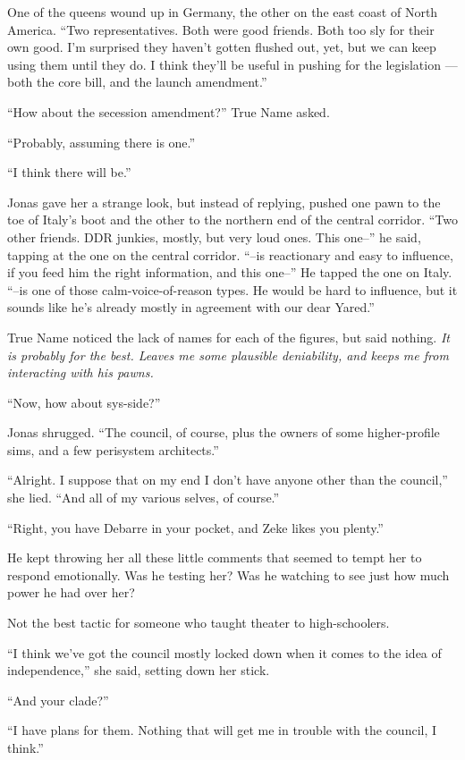 One of the queens wound up in Germany, the other on the east coast of North America. ``Two representatives. Both were good friends. Both too sly for their own good. I'm surprised they haven't gotten flushed out, yet, but we can keep using them until they do. I think they'll be useful in pushing for the legislation — both the core bill, and the launch amendment.''

``How about the secession amendment?'' True Name asked.

``Probably, assuming there is one.''

``I think there will be.''

Jonas gave her a strange look, but instead of replying, pushed one pawn to the toe of Italy's boot and the other to the northern end of the central corridor. ``Two other friends. DDR junkies, mostly, but very loud ones. This one--'' he said, tapping at the one on the central corridor. ``--is reactionary and easy to influence, if you feed him the right information, and this one--'' He tapped the one on Italy. ``--is one of those calm-voice-of-reason types. He would be hard to influence, but it sounds like he's already mostly in agreement with our dear Yared.''

True Name noticed the lack of names for each of the figures, but said nothing. \emph{It is probably for the best. Leaves me some plausible deniability, and keeps me from interacting with his pawns.}

``Now, how about sys-side?''

Jonas shrugged. ``The council, of course, plus the owners of some higher-profile sims, and a few perisystem architects.''

``Alright. I suppose that on my end I don't have anyone other than the council,'' she lied. ``And all of my various selves, of course.''

``Right, you have Debarre in your pocket, and Zeke likes you plenty.''

He kept throwing her all these little comments that seemed to tempt her to respond emotionally. Was he testing her? Was he watching to see just how much power he had over her?

Not the best tactic for someone who taught theater to high-schoolers.

``I think we've got the council mostly locked down when it comes to the idea of independence,'' she said, setting down her stick.

``And your clade?''

``I have plans for them. Nothing that will get me in trouble with the council, I think.''

